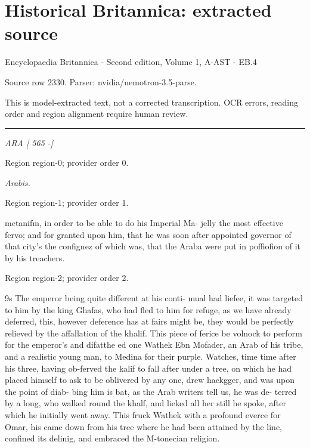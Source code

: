 \documentclass[11pt]{article}
\begin{document}
\section*{Historical Britannica: extracted source}
Encyclopaedia Britannica - Second edition, Volume 1, A-AST - EB.4\par
{\small Source row 2330. Parser: nvidia/nemotron-3.5-parse.\par}
{\small This is model-extracted text, not a corrected transcription. OCR errors, reading order and region alignment require human review.\par}
\hrule\medskip
{\small\itshape ARA [ 565 -]\par}

{\scriptsize\color{gray} Region region-0; provider order 0.\par}
\medskip

{\small\itshape Arabis.\par}

{\scriptsize\color{gray} Region region-1; provider order 1.\par}
\medskip

metanifm, in order to be able to do his Imperial Ma- jelly the most effective fervo; and for granted upon him, that he was soon after appointed governor of that city’s the confignez of which was, that the Araba were put in poffiofion of it by his treachers.
\par

{\scriptsize\color{gray} Region region-2; provider order 2.\par}
\medskip

9s The emperor being quite different at his conti- mual had liefee, it was targeted to him by the king Ghafas, who had fled to him for refuge, as we have already deferred, this, however deference has at fairs might be, they would be perfectly relieved by the affallation of the khalif. This piece of ferice be volnock to perform for the emperor's and difatthe ed one Wathek Ebn Mofader, an Arab of his tribe, and a realistic young man, to Medina for their purple. Watches, time time after his three, having ob-ferved the kalif to fall after under a tree, on which he had placed himself to ask to be oblivered by any one, drew hackgger, and was upon the point of diab- bing him is bat, as the Arab writers tell us, he was de- terred by a long, who walked round the khalf, and lieked all her still he spoke, after which he initially went away. This fruck Wathek with a profound everce for Omar, his came down from his tree where he had been attained by the line, confined its delinig, and embraced the M-tonecian religion.
\par
\end{document}
